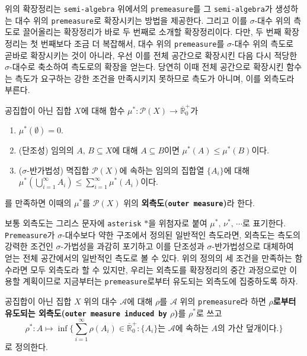 위의 확장정리는 \texttt{semi-algebra} 위에서의 \texttt{premeasure}를 그 \texttt{semi-algebra}가 생성하는 대수 위의 \texttt{premeasure}로 확장시키는 방법을 제공한다. 그리고 이를 $\sigma$-대수 위의 측도로 끌어올리는 확장정리가 바로 두 번째로 소개할 확장정리이다. 다만, 두 번째 확장정리는 첫 번째보다 조금 더 복잡해서, 대수 위의 \texttt{premeasure}를 $\sigma$-대수 위의 측도로 곧바로 확장시키는 것이 아니라, 우선 이를 전체 공간으로 확장시킨 다음 다시 적당한 $\sigma$-대수로 축소하여 측도로의 확장을 얻는다. 당연히 이때 전체 공간으로 확장시킨 함수는 측도가 요구하는 강한 조건을 만족시키지 못하므로 측도가 아니며, 이를 외측도라 부른다.

\begin{definition}
    공집합이 아닌 집합 $X$에 대해 함수 $\mu^*:\mathcal{P}(X)\to\overline{\mathbb{R}}^+_0$가
    \begin{enumerate}
        \item $\mu^*(\emptyset)=0$.
        \item (단조성) 임의의 $A,\,B\subseteq X$에 대해 $A\subseteq B$이면 $\mu^*(A)\leq\mu^*(B)$이다.
        \item ($\sigma$-반가법성) 멱집합 $\mathcal{P}(X)$에 속하는 임의의 집합열 $\{A_i\}$에 대해 $\mu^*(\bigcup_{i=1}^\infty A_i)\leq\sum_{i=1}^\infty\mu^*(A_i)$이다.
    \end{enumerate}
    를 만족하면 이때의 $\mu^*$를 $\mathcal{P}(X)$ 위의 \textbf{외측도(\texttt{outer measure})}라 한다.
\end{definition}

보통 외측도는 그리스 문자에 \texttt{asterisk} $*$을 위첨자로 붙여 $\mu^*,\,\nu^*,\,\cdots$로 표기한다. \texttt{Premeasure}가 $\sigma$-대수보다 약한 구조에서 정의된 일반적인 측도라면, 외측도는 측도의 강력한 조건인 $\sigma$-가법성을 과감히 포기하고 이를 단조성과 $\sigma$-반가법성으로 대체하여 얻는 전체 공간에서의 일반적인 측도로 볼 수 있다. 위의 정의의 세 조건을 만족하는 함수라면 모두 외측도라 할 수 있지만, 우리는 외측도를 확장정리의 중간 과정으로만 이용할 계획이므로 지금부터는 \texttt{premeasure}로부터 유도되는 외측도에 집중하도록 하자.

\begin{definition}
    공집합이 아닌 집합 $X$ 위의 대수 $\mathcal{A}$에 대해 $\rho$를 $\mathcal{A}$ 위의 \texttt{premeasure}라 하면 \textbf{$\rho$로부터 유도되는 외측도(\texttt{outer measure induced by} $\rho$)}를 $\rho^*$로 쓰고
    \begin{equation*}
        \rho^*:A\mapsto\inf\bigg\{\sum_{i=1}^\infty\rho(A_i)\in\overline{\mathbb{R}}^+_0:\{A_i\}\textrm{는 $\mathcal{A}$에 속하는 $A$의  가산 덮개이다.}\bigg\}
    \end{equation*}
      로 정의한다.
\end{definition}

